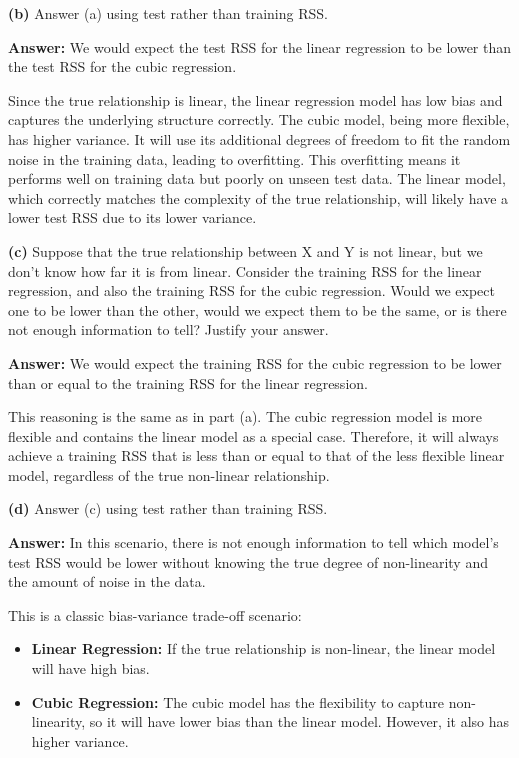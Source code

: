 \documentclass[
]{article}
\providecommand{\tightlist}{%
  \setlength{\itemsep}{0pt}\setlength{\parskip}{0pt}}
\begin{document}
\textbf{(b)} Answer (a) using test rather than training RSS.

\textbf{Answer:} We would expect the test RSS for the linear regression
to be lower than the test RSS for the cubic regression.

Since the true relationship is linear, the linear regression model has
low bias and captures the underlying structure correctly. The cubic
model, being more flexible, has higher variance. It will use its
additional degrees of freedom to fit the random noise in the training
data, leading to overfitting. This overfitting means it performs well on
training data but poorly on unseen test data. The linear model, which
correctly matches the complexity of the true relationship, will likely
have a lower test RSS due to its lower variance.

\textbf{(c)} Suppose that the true relationship between X and Y is not
linear, but we don't know how far it is from linear. Consider the
training RSS for the linear regression, and also the training RSS for
the cubic regression. Would we expect one to be lower than the other,
would we expect them to be the same, or is there not enough information
to tell? Justify your answer.

\textbf{Answer:} We would expect the training RSS for the cubic
regression to be lower than or equal to the training RSS for the linear
regression.

This reasoning is the same as in part (a). The cubic regression model is
more flexible and contains the linear model as a special case.
Therefore, it will always achieve a training RSS that is less than or
equal to that of the less flexible linear model, regardless of the true
non-linear relationship.

\textbf{(d)} Answer (c) using test rather than training RSS.

\textbf{Answer:} In this scenario, there is not enough information to
tell which model's test RSS would be lower without knowing the true
degree of non-linearity and the amount of noise in the data.

This is a classic bias-variance trade-off scenario:

\begin{itemize}
\tightlist
\item
  \textbf{Linear Regression:} If the true relationship is non-linear,
  the linear model will have high bias.
\item
  \textbf{Cubic Regression:} The cubic model has the flexibility to
  capture non-linearity, so it will have lower bias than the linear
  model. However, it also has higher variance.
\end{itemize}
\end{document}

